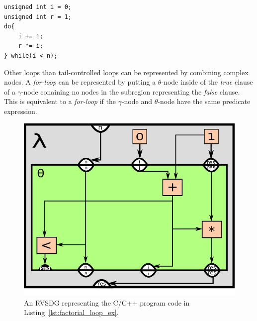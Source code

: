 \begin{itemize}
\begin{centering}
	\noindent\begin{minipage}{\textwidth}
		\begin{CenteredBox}
		\begin{lstlisting}[style=global_customcpp]
unsigned int i = 0;
unsigned int r = 1;
do{
	i += 1;
	r *= i;
} while(i < n);
		\end{lstlisting}
		\end{CenteredBox}
	\end{minipage}
	\label{lst:factorial_loop_ex}
\end{centering}

Other loops than tail-controlled loops can be represented by combining complex
nodes. A \textit{for-loop} can be represented by putting a $\theta$-node inside
of the \textit{true} clause of a $\gamma$-node conaining no nodes in the
subregion representing the \textit{false} clause. This is equivalent to a
\textit{for-loop} if the $\gamma$-node and $\theta$-node have the same predicate
expression.


\begin{figure}[H]
	\centering
	\includegraphics[width=\textwidth]{figures/iterative_factorial_ex}
	\caption{An RVSDG representing the C/C++ program code in
Listing~\ref{lst:factorial_loop_ex}.}
	\label{fig:factorial_loop_ex}
\end{figure}


\end{itemize}

